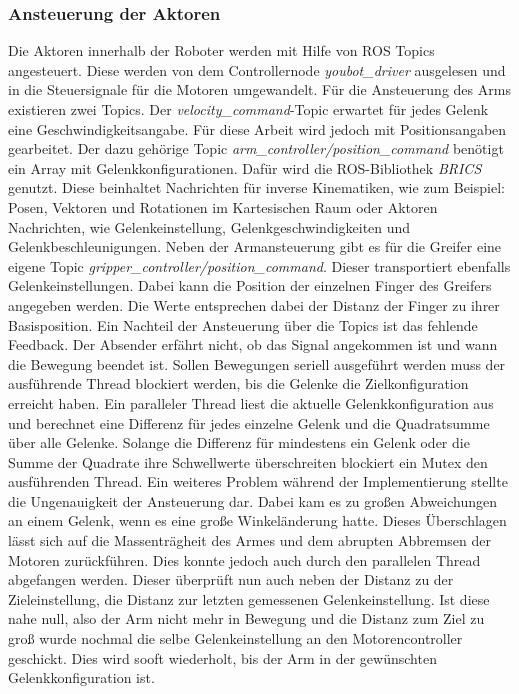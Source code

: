 \subsubsection{Ansteuerung der Aktoren}
\label{sec:impl-res-ak}
Die Aktoren innerhalb der Roboter werden mit Hilfe von ROS Topics angesteuert. Diese werden von dem Controllernode \textit{youbot\_driver} ausgelesen und in die Steuersignale für die Motoren umgewandelt. Für die Ansteuerung des Arms existieren zwei Topics. Der \textit{velocity\_command}-Topic erwartet für jedes Gelenk eine Geschwindigkeitsangabe. Für diese Arbeit wird jedoch mit Positionsangaben gearbeitet. Der dazu gehörige Topic \textit{arm\_controller/position\_command} benötigt ein Array mit Gelenkkonfigurationen. Dafür wird die ROS-Bibliothek \textit{BRICS} genutzt. Diese beinhaltet Nachrichten für inverse Kinematiken, wie zum  Beispiel: Posen, Vektoren und Rotationen im Kartesischen Raum oder Aktoren Nachrichten, wie Gelenkeinstellung, Gelenkgeschwindigkeiten und Gelenkbeschleunigungen. Neben der Armansteuerung gibt es für die Greifer eine eigene Topic \textit{gripper\_controller/position\_command}. Dieser transportiert ebenfalls Gelenkeinstellungen. Dabei kann die Position der einzelnen Finger des Greifers angegeben werden. Die Werte entsprechen dabei der Distanz der Finger zu ihrer Basisposition. Ein Nachteil der Ansteuerung über die Topics ist das fehlende Feedback. Der Absender erfährt nicht, ob das Signal angekommen ist und wann die Bewegung beendet ist. Sollen Bewegungen seriell ausgeführt werden muss der ausführende Thread blockiert werden, bis die Gelenke die Zielkonfiguration erreicht haben.  Ein paralleler Thread liest die aktuelle Gelenkkonfiguration aus und berechnet eine Differenz für jedes einzelne Gelenk und die Quadratsumme über alle Gelenke. Solange die Differenz für mindestens ein Gelenk oder die Summe der Quadrate ihre Schwellwerte überschreiten blockiert ein Mutex den ausführenden Thread. Ein weiteres Problem während der Implementierung stellte die Ungenauigkeit der Ansteuerung dar. Dabei kam es zu großen Abweichungen an einem Gelenk, wenn es eine große Winkeländerung hatte. Dieses Überschlagen lässt sich auf die Massenträgheit des Armes und dem abrupten Abbremsen der Motoren zurückführen. Dies konnte jedoch auch durch den parallelen Thread abgefangen werden. Dieser überprüft nun auch neben der Distanz zu der Zieleinstellung, die Distanz zur letzten gemessenen Gelenkeinstellung. Ist diese nahe null, also der Arm nicht mehr in Bewegung und die Distanz zum Ziel zu groß wurde nochmal die selbe Gelenkeinstellung an den Motorencontroller geschickt. Dies wird sooft wiederholt, bis der Arm in der gewünschten Gelenkkonfiguration ist. 

